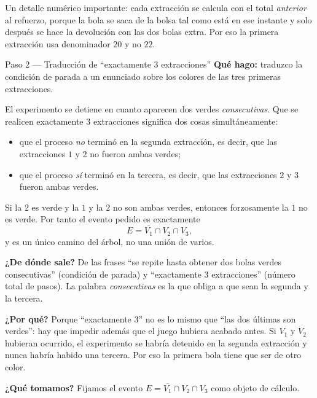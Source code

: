 \documentclass[11pt]{article}
\begin{document}
\begin{nota}
Un detalle numérico importante: cada extracción se calcula con el total \emph{anterior} al refuerzo, porque la bola se saca de la bolsa tal como está en ese instante y solo después se hace la devolución con las dos bolas extra. Por eso la primera extracción usa denominador $20$ y no $22$.
\end{nota}

\begin{paso}{Paso 2 --- Traducción de ``exactamente 3 extracciones''}
\textbf{Qué hago:} traduzco la condición de parada a un enunciado sobre los colores de las tres primeras extracciones.

El experimento se detiene en cuanto aparecen dos verdes \emph{consecutivas}. Que se realicen exactamente $3$ extracciones significa dos cosas simultáneamente:
\begin{itemize}[leftmargin=1.4em]
\item que el proceso \emph{no} terminó en la segunda extracción, es decir, que las extracciones $1$ y $2$ no fueron ambas verdes;
\item que el proceso \emph{sí} terminó en la tercera, es decir, que las extracciones $2$ y $3$ fueron ambas verdes.
\end{itemize}
Si la $2$ es verde y la $1$ y la $2$ no son ambas verdes, entonces forzosamente la $1$ no es verde. Por tanto el evento pedido es exactamente
\[
E=\overline{V_1}\cap V_2\cap V_3 ,
\]
y es un único camino del árbol, no una unión de varios.

\textbf{¿De dónde sale?} De las frases ``se repite hasta obtener dos bolas verdes consecutivas'' (condición de parada) y ``exactamente 3 extracciones'' (número total de pasos). La palabra \emph{consecutivas} es la que obliga a que sean la segunda y la tercera.

\textbf{¿Por qué?} Porque ``exactamente $3$'' no es lo mismo que ``las dos últimas son verdes'': hay que impedir además que el juego hubiera acabado antes. Si $V_1$ y $V_2$ hubieran ocurrido, el experimento se habría detenido en la segunda extracción y nunca habría habido una tercera. Por eso la primera bola tiene que ser de otro color.

\textbf{¿Qué tomamos?} Fijamos el evento $E=\overline{V_1}\cap V_2\cap V_3$ como objeto de cálculo.
\end{paso}
\end{document}
